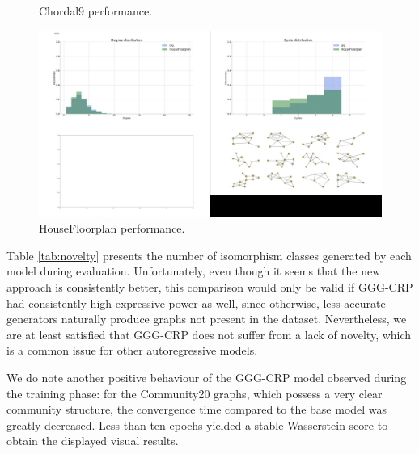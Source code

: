 \begin{figure}[!ht]
\begin{minipage}{0.475\textwidth}
    \caption[GGG-CRP performance on Chordal9.]{Chordal9 performance.}
    \label{fig:chordal9}    
    \end{minipage}
    \hfill
    \begin{minipage}{0.475\textwidth}
    \centering
    \includegraphics[width=\textwidth]{figures/gggcrp/Housefloorplan.pdf}
    \caption[GGG-CRP performance on HouseFloorplan.]{HouseFloorplan performance.}
    \label{fig:house}    
    \end{minipage}
\end{figure}
Table \ref{tab:novelty} presents the number of isomorphism classes generated by each model during evaluation. Unfortunately, even though it seems that the new approach is consistently better, this comparison would only be valid if GGG-CRP had consistently high expressive power as well, since otherwise, less accurate generators naturally produce graphs not present in the dataset. Nevertheless, we are at least satisfied that GGG-CRP does not suffer from a lack of novelty, which is a common issue for other autoregressive models.
\begin{table}[H]
\centering
\caption[Comparison of novelty and diversity between GG-GAN and GGG-CRP.]{Comparison of novelty and diversity between GG-GAN and GGG-CRP. A higher number of isomorphism classes denotes better performance.}
\label{tab:novelty}
\end{table}
We do note another positive behaviour of the GGG-CRP model observed during the training phase: for the Community20 graphs, which possess a very clear community structure, the convergence time compared to the base model was greatly decreased. Less than ten epochs yielded a stable Wasserstein score to obtain the displayed visual results. 

